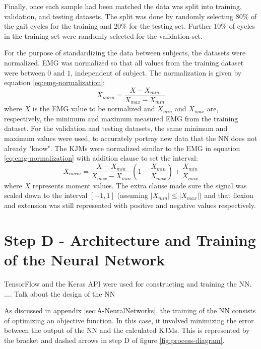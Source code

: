 \documentclass[../main.tex]{subfiles}
\begin{document}
Finally, once each sample had been matched the data was split into training, validation, and testing datasets.
The split was done by randomly selecting $80\%$ of the gait cycles for the training and $20\%$ for the testing set.
Further $10\%$ of cycles in the training set were randomly selected for the validation set.

For the purpose of standardizing the data between subjects, the datasets were normalized.
\ac{EMG} was normalized so that all values from the training dataset were between $0$ and $1$, independent of subject.
The normalization is given by equation \ref{eq:emg-normalization}:
\begin{equation}
\label{eq:emg-normalization}
    X_{norm} = \frac{X - X_{min}}{X_{max} - X_{min}}
\end{equation}
where $X$ is the \ac{EMG} value to be normalized and $X_{min}$ and $X_{max}$ are, respectively, the minimum and maximum measured \ac{EMG} from the training dataset. 
For the validation and testing datasets, the same minimum and maximum values were used, to accurately portray new data that the \ac{NN} does not already "know".
The \acp{KJM} were normalized similar to the \ac{EMG} in equation \ref{eq:emg-normalization} with addition clause to set the interval:
\begin{equation}
\label{eq:moment-normalization}
    X_{norm} = \frac{X - X_{min}}{X_{max} - X_{min}}\left(1 - \frac{X_{min}}{X_{max}}\right) + \frac{X_{min}}{X_{max}}
\end{equation}
where $X$ represents moment values. 
The extra clause made sure the signal was scaled down to the interval $[-1,1]$ (assuming $\left|X_{min}\right| \leq \left|X_{max}\right|$) and that flexion and extension was still represented with positive and negative values respectively.

\section{Step D - Architecture and Training of the Neural Network}
TensorFlow \cite{tensorflow2015-whitepaper} and the Keras API \cite{chollet2015keras} were used for constructing and training the \ac{NN}.
.... Talk about the design of the \ac{NN}

As discussed in appendix \ref{sec:A-NeuralNetworks}, the training of the \ac{NN} consists of optimizing an objective function.
In this case, it involved minimizing the error between the output of the \ac{NN} and the calculated \acp{KJM}.
This is represented by the bracket and dashed arrows in step D of figure \ref{fig:process-diagram}.
\end{document}
